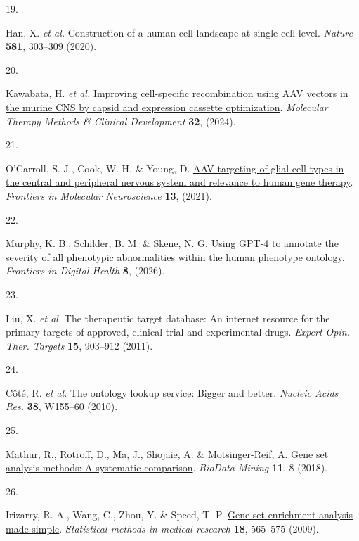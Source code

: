 \documentclass[
]{article}
\newlength{\cslhangindent}
\newlength{\csllabelwidth}
\newenvironment{CSLReferences}[2] %
 {\begin{list}{}{%
  \setlength{\itemindent}{0pt}
  \setlength{\leftmargin}{0pt}
  \setlength{\parsep}{0pt}
  \ifodd #1
   \setlength{\leftmargin}{\cslhangindent}
   \setlength{\itemindent}{-1\cslhangindent}
  \fi
  \setlength{\itemsep}{#2\baselineskip}}}
 {\end{list}}
\newcommand{\CSLLeftMargin}[1]{\parbox[t]{\csllabelwidth}{\strut#1\strut}}
\newcommand{\CSLRightInline}[1]{\parbox[t]{\linewidth - \csllabelwidth}{\strut#1\strut}}
\begin{document}
\begin{CSLReferences}{0}{0}
\CSLLeftMargin{19. }%
\CSLRightInline{Han, X. \emph{et al.} Construction of a human cell
landscape at single-cell level. \emph{Nature} \textbf{581}, 303--309
(2020).}

\CSLLeftMargin{20. }%
\CSLRightInline{Kawabata, H. \emph{et al.}
\href{https://doi.org/10.1016/j.omtm.2024.101185}{Improving
cell-specific recombination using AAV vectors in the murine CNS by
capsid and expression cassette optimization}. \emph{Molecular Therapy
Methods \& Clinical Development} \textbf{32}, (2024).}

\CSLLeftMargin{21. }%
\CSLRightInline{O'Carroll, S. J., Cook, W. H. \& Young, D.
\href{https://doi.org/10.3389/fnmol.2020.618020}{AAV targeting of glial
cell types in the central and peripheral nervous system and relevance to
human gene therapy}. \emph{Frontiers in Molecular Neuroscience}
\textbf{13}, (2021).}

\CSLLeftMargin{22. }%
\CSLRightInline{Murphy, K. B., Schilder, B. M. \& Skene, N. G.
\href{https://doi.org/10.3389/fdgth.2026.1794934}{Using {GPT-4} to
annotate the severity of all phenotypic abnormalities within the human
phenotype ontology}. \emph{Frontiers in Digital Health} \textbf{8},
(2026).}

\CSLLeftMargin{23. }%
\CSLRightInline{Liu, X. \emph{et al.} The therapeutic target database:
An internet resource for the primary targets of approved, clinical trial
and experimental drugs. \emph{Expert Opin. Ther. Targets} \textbf{15},
903--912 (2011).}

\CSLLeftMargin{24. }%
\CSLRightInline{Côté, R. \emph{et al.} The ontology lookup service:
Bigger and better. \emph{Nucleic Acids Res.} \textbf{38}, W155--60
(2010).}

\CSLLeftMargin{25. }%
\CSLRightInline{Mathur, R., Rotroff, D., Ma, J., Shojaie, A. \&
Motsinger-Reif, A. \href{https://doi.org/10.1186/s13040-018-0166-8}{Gene
set analysis methods: A systematic comparison}. \emph{BioData Mining}
\textbf{11}, 8 (2018).}

\CSLLeftMargin{26. }%
\CSLRightInline{Irizarry, R. A., Wang, C., Zhou, Y. \& Speed, T. P.
\href{https://doi.org/10.1177/0962280209351908}{Gene set enrichment
analysis made simple}. \emph{Statistical methods in medical research}
\textbf{18}, 565--575 (2009).}


\end{CSLReferences}
\end{document}
